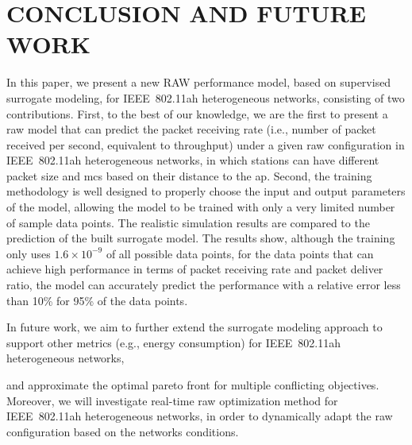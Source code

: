 \section{CONCLUSION AND FUTURE WORK \label{sec:conclusion}}

In this paper, we present a new RAW performance model, based on supervised surrogate modeling, for IEEE~802.11ah heterogeneous networks, consisting of
two contributions. First, to the best of our knowledge, we are the first to present a \gls{raw} model that can predict the packet receiving rate (i.e., number of packet received per second, equivalent to throughput) under a given \gls{raw} configuration in IEEE~802.11ah heterogeneous networks, in which stations can have different packet size and \gls{mcs} based on their distance to the \gls{ap}. Second, the training methodology is well designed to properly choose the input and output parameters of the model, allowing the model to be trained with only a very limited number of sample data points. The realistic simulation results are compared to the prediction of the built surrogate model. The results show, although the training only uses $1.6 \times 10^{-9}$ of all possible data points, for the data points that can achieve high performance in terms of packet receiving rate and packet deliver ratio,  the model can accurately predict the performance with a relative error less than 10\% for 95\% of the data points. 

In future work, we aim to further extend the surrogate modeling approach to support other metrics (e.g., energy consumption) for IEEE~802.11ah heterogeneous networks, 

and approximate the optimal pareto front for multiple conflicting objectives. Moreover, we will investigate real-time \gls{raw} optimization method for IEEE~802.11ah heterogeneous networks, in order to dynamically adapt the \gls{raw} configuration based on the networks conditions.   





 




